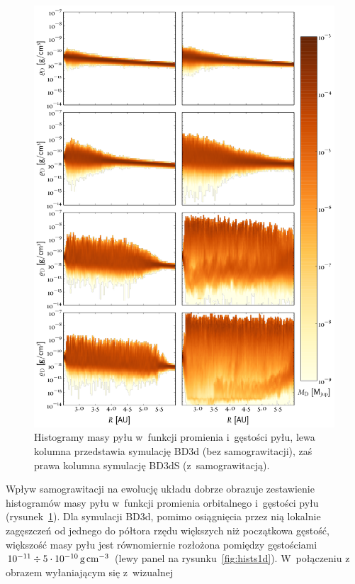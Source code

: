 \begin{figure} 
  \centering
  \includegraphics[height=0.9\textheight]{figures/hists2d}
  \caption[Histogramy masy pyłu w~funkcji promienia i~gęstości pyłu dla
  symulacji BD3d i BD3dS.]
  {Histogramy masy pyłu w~funkcji promienia i~gęstości pyłu, lewa
  kolumna przedstawia symulację BD3d (bez samograwitacji), zaś prawa kolumna
  symulację BD3dS (z~samograwitacją).}
  \label{fig:hists} 
\end{figure}
%
Wpływ samograwitacji na ewolucję układu dobrze obrazuje zestawienie histogramów
masy pyłu w~funkcji promienia orbitalnego i~gęstości pyłu
(rysunek~\ref{fig:hists}). Dla symulacji BD3d, pomimo osiągnięcia przez nią
lokalnie zagęszczeń od jednego do półtora rzędu większych niż początkowa
gęstość, większość masy pyłu jest równomiernie rozłożona pomiędzy gęstościami
$10^{-11} \div 5\cdot10^{-10}\hbox{$\thinspace\textrm{g}$}\hbox{$\thinspace\textrm{cm}$}^{-3}$ (lewy panel na
rysunku~\ref{fig:hists1d}). W~połączeniu z obrazem wyłaniającym się z~wizualnej
